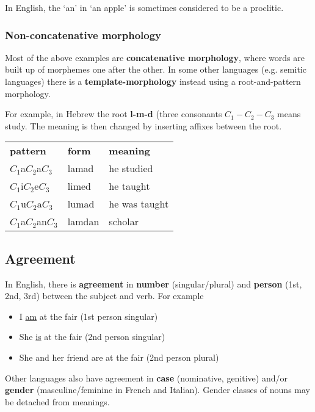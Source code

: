 \documentclass[Report.tex]{subfiles}
\begin{document}
In English, the `an' in `an apple' is sometimes considered to
be a proclitic.

\subsubsection{Non-concatenative morphology}
Most of the above examples are \textbf{concatenative morphology},
where words are built up of morphemes one after the other.
In some other languages (e.g. semitic languages) there is a
\textbf{template-morphology} instead using a root-and-pattern
morphology.

For example, in Hebrew the root \textbf{l-m-d} (three consonants
$C_1-C_2-C_3$ means study. The meaning is then changed by
inserting affixes between the root.
\begin{table}[H]
\begin{tabular}{l l l}
  \textbf{pattern} & \textbf{form} & \textbf{meaning} \\
  $C_1$a$C_2$a$C_3$ & lamad & he studied \\
  $C_1$i$C_2$e$C_3$ & limed & he taught \\
  $C_1$u$C_2$a$C_3$ & lumad & he was taught \\
  $C_1$a$C_2$an$C_3$ & lamdan & scholar 
\end{tabular}
\end{table}

\subsection{Agreement}
In English, there is \textbf{agreement} in \textbf{number}
(singular/plural) and \textbf{person} (1st, 2nd, 3rd) between
the subject and verb. For example
\begin{itemize}
\item I \underline{am} at the fair (1st person singular)
\item She \underline{is} at the fair (2nd person singular)
\item She and her friend are at the fair (2nd person plural)
\end{itemize}
Other languages also have agreement in \textbf{case}
(nominative, genitive) and/or \textbf{gender}
(masculine/feminine in French and Italian). Gender classes of nouns
may be detached from meanings.
\end{document}
